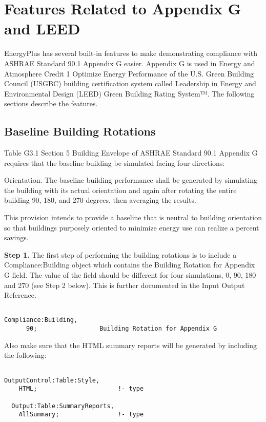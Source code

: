 \section{Features Related to Appendix G and LEED}\label{features-related-to-appendix-g-and-leed}

EnergyPlus has several built-in features to make demonstrating compliance with ASHRAE Standard 90.1 Appendix G easier. Appendix G is used in Energy and Atmosphere Credit 1 Optimize Energy Performance of the U.S. Green Building Council (USGBC) building certification system called Leadership in Energy and Environmental Design (LEED) Green Building Rating System™. The following sections describe the features.

\subsection{Baseline Building Rotations}\label{baseline-building-rotations}

Table G3.1 Section 5 Building Envelope of ASHRAE Standard 90.1 Appendix G requires that the baseline building be simulated facing four directions:

Orientation. The baseline building performance shall be generated by simulating the building with its actual orientation and again after rotating the entire building 90, 180, and 270 degrees, then averaging the results.

This provision intends to provide a baseline that is neutral to building orientation so that buildings purposely oriented to minimize energy use can realize a percent savings.

\textbf{Step 1.} The first step of performing the building rotations is to include a Compliance:Building object which contains the Building Rotation for Appendix G field. The value of the field should be different for four simulations, 0, 90, 180 and 270 (see Step 2 below). This is further documented in the Input Output Reference.

\begin{lstlisting}

Compliance:Building,
      90;                 Building Rotation for Appendix G
\end{lstlisting}

Also make sure that the HTML summary reports will be generated by including the following:

\begin{lstlisting}

OutputControl:Table:Style,
    HTML;                      !- type

  Output:Table:SummaryReports,
    AllSummary;                !- type
\end{lstlisting}

